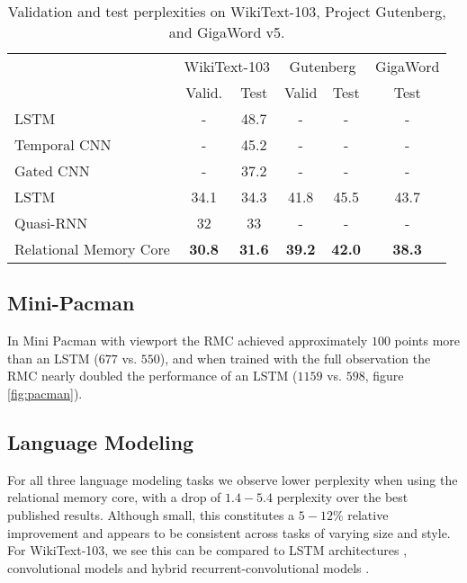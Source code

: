 \documentclass{article}
\begin{document}
\begin{table}[h!]
    \centering
    \caption{Validation and test perplexities on WikiText-103, Project Gutenberg, and GigaWord v5.}
    \begin{tabular}{lccccc}
    \toprule
    \multicolumn{1}{c}{} & \multicolumn{2}{c}{WikiText-103} & \multicolumn{2}{c}{Gutenberg} & \multicolumn{1}{c}{GigaWord}\\
    & Valid. & Test & Valid & Test & Test \\
    \midrule
    LSTM \cite{grave2016improving} & - & 48.7 & - & - & - \\
    Temporal CNN \cite{bai2018convolutional} & - & 45.2 & - & - & - \\
    Gated CNN \cite{dauphin2016language} & - & 37.2 & - & - & - \\ 
    LSTM \cite{rae2018fast} & 34.1 & 34.3 &  41.8 & 45.5 & 43.7\\
    Quasi-RNN \cite{merity2018scalable} & 32 & 33 & - & - & -  \\
    \midrule
    Relational Memory Core & \textbf{30.8} & \textbf{31.6} & \textbf{39.2} & \textbf{42.0}  & \textbf{38.3} \\
    \bottomrule
    \end{tabular}
    \label{tab:wiki}
\end{table}

\subsection{Mini-Pacman}
In Mini Pacman with viewport the RMC achieved approximately $100$ points more than an LSTM ($677$ vs. $550$), and when trained with the full observation the RMC nearly doubled the performance of an LSTM ($1159$ vs. $598$, figure \ref{fig:pacman}).


\subsection{Language Modeling}
For all three language modeling tasks we observe lower perplexity when using the relational memory core, with a drop of $1.4 - 5.4$ perplexity over the best published results. Although small, this constitutes a $5 - 12$\% relative improvement and appears to be consistent across tasks of varying size and style. For WikiText-103, we see this can be compared to LSTM architectures \citep{graves2016hybrid, rae2018fast}, convolutional models \citep{dauphin2016language} and hybrid recurrent-convolutional models \citep{merity2018scalable}.
\end{document}
